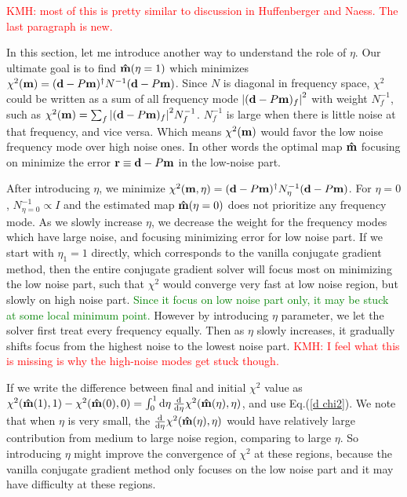\documentclass[twocolumn,linenumbers]{aastex631}
\newcommand{\vbd}{\vb{d}}
\newcommand{\vbm}{\vb{m}}
\newcommand{\inv}[1]{#1^{-1}}
\newcommand{\hatm}{\vb{\hat{m}}}
\newcommand{\Nbar}{\bar{N}}
\newcommand{\Neta}{N_{\eta}}
\newcommand{\kmh}[1]{\textcolor{red}{KMH: #1}}
\begin{document}
\kmh{most of this is pretty similar to discussion in Huffenberger and Naess.  The last paragraph is new.}

In this section, let me introduce another way to understand the role of $\eta$.
Our ultimate goal is to find $\hatm(\eta=1)$ which minimizes 
$\chi^2(\vbm) = (\vbd - P\vbm)^{\dagger} \inv{N} (\vbd - P\vbm)$.
Since $N$ is diagonal in frequency space,
$\chi^2$ could be written as a sum of all frequency mode 
$\qty|(\vbd-P\vbm)_f|^2$ with weight $\inv{N}_f$, such as
$\chi^2(\vbm) = \sum_f \qty|(\vbd-P\vbm)_f|^2 \inv{N}_f$.
$\inv{N}_f$ is large when there is little noise at that frequency,
and vice versa.
Which means $\chi^2(\vbm)$ would favor the low noise frequency mode over high 
noise ones.
In other words the optimal map $\hatm$ focusing on minimize the error
$\vb{r} \equiv \vbd - P\vbm$ in the low-noise part.

After introducing $\eta$, we minimize
$\chi^2(\vbm,\eta)=(\vbd-P\vbm)^{\dagger} N_{\eta}^{-1} (\vbd - P\vbm)$.
For $\eta=0$, $N^{-1}_{\eta=0} \propto I$ and the estimated map $\hatm(\eta=0)$
does not prioritize any frequency mode.
As we slowly increase $\eta$, we decrease the weight for the frequency modes
which have large noise, and focusing minimizing error for low noise part.
If we start with $\eta_1=1$ directly, which corresponds to the vanilla conjugate
gradient method, then the entire conjugate gradient solver
will focus most on minimizing the low noise part, such that $\chi^2$ would
converge very fast at low noise region, but slowly on high noise part.
\textcolor{green}{Since it focus on low noise part only, it may be stuck at some local minimum point.}
However by introducing $\eta$ parameter, we let the solver first treat every
frequency equally.
Then as $\eta$ slowly increases, it gradually shifts focus from the highest noise to the lowest noise
part.  \kmh{I feel what this is missing is why the high-noise modes get stuck though.}


If we write the difference between final and initial $\chi^2$ value as
$\chi^2(\hatm(1),1) - \chi^2(\hatm(0),0) = \int_0^1 \dd{\eta}
\dv{\eta} \chi^2(\hatm(\eta),\eta)$,
and use Eq.(\ref{d chi2}).
We note that when $\eta$ is very small, 
the $\dv{\eta}\chi^2(\hatm(\eta),\eta)$ would have relatively large
contribution from medium to large noise region, comparing to large $\eta$.
So introducing $\eta$ might improve the convergence of $\chi^2$ at these
regions, because the vanilla conjugate gradient method only focuses on the low noise
part and it may have difficulty at these regions.
\end{document}
